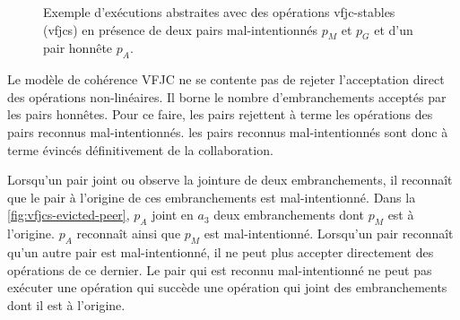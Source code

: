 \begin{figure}[htb]
\centering
{}
\caption[Stabilité \acl{VFJC} en présence de deux pairs mal-intentionnés]{Exemple d'exécutions abstraites avec des opérations vfjc-stables (vfjcs) en présence de deux pairs mal-intentionnés $p_M$ et $p_G$ et d'un pair honnête $p_A$.}\label{fig:vfjcs-two-malicious}
\end{figure}

Le modèle de cohérence \acl{VFJC} ne se contente pas de rejeter l'acceptation direct des opérations non-linéaires.
Il borne le nombre d'embranchements acceptés par les pairs honnêtes.
Pour ce faire, les pairs rejettent à terme les opérations des pairs reconnus mal-intentionnés.
les pairs reconnus mal-intentionnés sont donc à terme évincés définitivement de la collaboration.

Lorsqu'un pair joint ou observe la jointure de deux embranchements, il reconnaît que le pair à l'origine de ces embranchements est mal-intentionné.
Dans la \autoref{fig:vfjcs-evicted-peer}, $p_A$ joint en $a_3$ deux embranchements dont $p_M$ est à l'origine.
$p_A$ reconnaît ainsi que $p_M$ est mal-intentionné.
Lorsqu'un pair reconnaît qu'un autre pair est mal-intentionné, il ne peut plus accepter directement des opérations de ce dernier.
Le pair qui est reconnu mal-intentionné ne peut pas exécuter une opération qui succède une opération qui joint des embranchements dont il est à l'origine.


